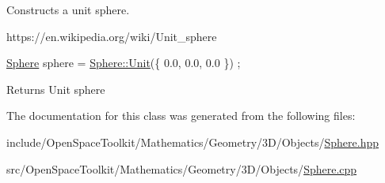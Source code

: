 Constructs a unit sphere. 

https\+://en.wikipedia.\+org/wiki/\+Unit\+\_\+sphere


\begin{DoxyCode}
\hyperlink{classostk_1_1math_1_1geom_1_1d3_1_1objects_1_1_sphere_a6920f72260a7b2c9ffc29283540e16c2}{Sphere} sphere = \hyperlink{classostk_1_1math_1_1geom_1_1d3_1_1objects_1_1_sphere_a5e0bd57337eb7e5c7eb19b66176d560b}{Sphere::Unit}(\{ 0.0, 0.0, 0.0 \}) ;
\end{DoxyCode}


\begin{DoxyReturn}{Returns}
Unit sphere 
\end{DoxyReturn}


The documentation for this class was generated from the following files\+:\begin{DoxyCompactItemize}
\item 
include/\+Open\+Space\+Toolkit/\+Mathematics/\+Geometry/3\+D/\+Objects/\hyperlink{_sphere_8hpp}{Sphere.\+hpp}\item 
src/\+Open\+Space\+Toolkit/\+Mathematics/\+Geometry/3\+D/\+Objects/\hyperlink{_sphere_8cpp}{Sphere.\+cpp}\end{DoxyCompactItemize}
